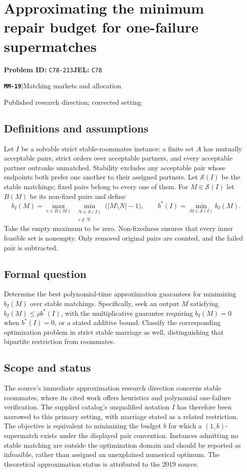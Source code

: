 \documentclass[11pt,a4paper]{article}
\newcommand{\entrymeta}[3]{{\sffamily\small\color{muted}\textbf{\texttt{#1}}\quad|\quad #2\par #3\par}}
\begin{document}
\section*{Approximating the minimum repair budget for one-failure supermatches}
\textbf{Problem ID:} \texttt{C78-213}\quad \textbf{JEL:} \texttt{C78}\par
\label{problem:OP-0560}
\label{beyond:MM-19}
\entrymeta{MM-19}{Matching markets and allocation}{Published research direction; corrected setting}
\subsection*{Definitions and assumptions}
Let $I$ be a solvable strict stable-roommates instance: a finite set $A$ has mutually acceptable pairs, strict orders over acceptable partners, and every acceptable partner outranks unmatched. Stability excludes any acceptable pair whose endpoints both prefer one another to their assigned partners. Let $\mathcal S(I)$ be the stable matchings; fixed pairs belong to every one of them. For $M\in\mathcal S(I)$ let $B(M)$ be its non-fixed pairs and define
\[
 b_I(M)=\max_{e\in B(M)}\ 
 \min_{\substack{N\in\mathcal S(I)\\e\notin N}}
 \bigl(|M\setminus N|-1\bigr),\qquad
 b^*(I)=\min_{M\in\mathcal S(I)}b_I(M).
\]
Take the empty maximum to be zero. Non-fixedness ensures that every inner feasible set is nonempty. Only removed original pairs are counted, and the failed pair is subtracted.
\subsection*{Formal question}
Determine the best polynomial-time approximation guarantees for minimizing $b_I(M)$ over stable matchings. Specifically, seek an output $M$ satisfying $b_I(M)\le\rho b^*(I)$, with the multiplicative guarantee requiring $b_I(M)=0$ when $b^*(I)=0$, or a stated additive bound. Classify the corresponding optimization problem in strict stable marriage as well, distinguishing that bipartite restriction from roommates.
\subsection*{Scope and status}
The source's immediate approximation research direction concerns stable roommates, where its cited work offers heuristics and polynomial one-failure verification. The supplied catalog's unqualified notation $I$ has therefore been narrowed to this primary setting, with marriage stated as a related restriction. The objective is equivalent to minimizing the budget $b$ for which a $(1,b)$-supermatch exists under the displayed pair convention. Instances admitting no stable matching are outside the optimization domain and should be reported as infeasible, rather than assigned an unexplained numerical optimum. The theoretical approximation status is attributed to the 2019 source.
\end{document}
